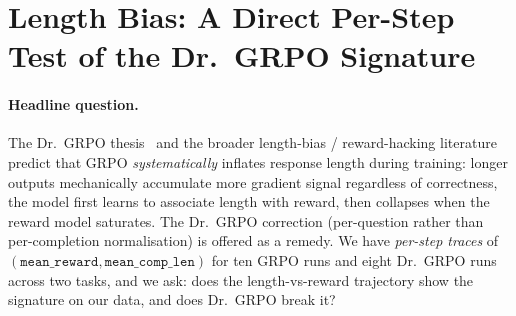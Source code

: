 \section{Length Bias: A Direct Per-Step Test of the Dr.~GRPO Signature}
\label{sec:length-bias-pillar}

\paragraph{Headline question.}
The Dr.~GRPO thesis~\cite{tong2025drgrpo} and the broader
length-bias / reward-hacking literature~\cite{ouyang2022training, christiano2017deeprlhf}
predict that GRPO
\emph{systematically} inflates response length during training:
longer outputs mechanically accumulate more gradient signal
regardless of correctness, the model first learns to associate length
with reward, then collapses when the reward model saturates. The
Dr.~GRPO correction (per-question rather than per-completion
normalisation) is offered as a remedy. We have
\emph{per-step traces} of $(\texttt{mean\_reward},
\texttt{mean\_comp\_len})$ for ten GRPO runs and eight Dr.~GRPO runs
across two tasks, and we ask: does the length-vs-reward trajectory
show the signature on our data, and does Dr.~GRPO break it?

